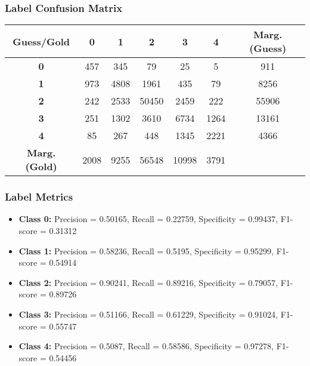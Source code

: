 \subsubsection{Label Confusion Matrix}
\begin{table}[h]
\centering
\begin{tabular}{c|ccccc|c}
\textbf{Guess/Gold} & \textbf{0} & \textbf{1} & \textbf{2} & \textbf{3} & \textbf{4} & \textbf{Marg. (Guess)} \\
\hline
\textbf{0} & 457 & 345 & 79 & 25 & 5 & 911 \\
\textbf{1} & 973 & 4808 & 1961 & 435 & 79 & 8256 \\
\textbf{2} & 242 & 2533 & 50450 & 2459 & 222 & 55906 \\
\textbf{3} & 251 & 1302 & 3610 & 6734 & 1264 & 13161 \\
\textbf{4} & 85 & 267 & 448 & 1345 & 2221 & 4366 \\
\hline
\textbf{Marg. (Gold)} & 2008 & 9255 & 56548 & 10998 & 3791 & \\
\end{tabular}
\end{table}

\subsubsection{Label Metrics}
\begin{itemize}
    \item \textbf{Class 0:} Precision = 0.50165, Recall = 0.22759, Specificity = 0.99437, F1-score = 0.31312
    \item \textbf{Class 1:} Precision = 0.58236, Recall = 0.5195, Specificity = 0.95299, F1-score = 0.54914
    \item \textbf{Class 2:} Precision = 0.90241, Recall = 0.89216, Specificity = 0.79057, F1-score = 0.89726
    \item \textbf{Class 3:} Precision = 0.51166, Recall = 0.61229, Specificity = 0.91024, F1-score = 0.55747
    \item \textbf{Class 4:} Precision = 0.5087, Recall = 0.58586, Specificity = 0.97278, F1-score = 0.54456
\end{itemize}

